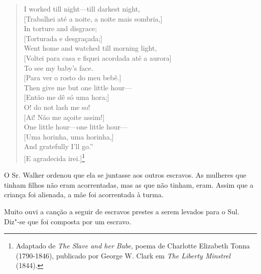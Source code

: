 \begin{verse}
I worked till night---till darkest night,\\
{[}Trabalhei até a noite, a noite mais sombria,{]}\\
In torture and disgrace;\\
{[}Torturada e desgraçada;{]}\\
Went home and watched till morning light,\\
{[}Voltei para casa e fiquei acordada até a aurora{]}\\
To see my baby's face.\\
{[}Para ver o rosto do meu bebê.{]}\\[5pt]

Then give me but one little hour---\\
{[}Então me dê só uma hora;{]}\\
O! do not lash me so!\\
{[}Ai! Não me açoite assim!{]}\\
One little hour---one little hour---\\
{[}Uma horinha, uma horinha,{]}\\
And gratefully I'll go.''\\
{[}E agradecida irei.{]}\footnote{Adaptado de
  \emph{The Slave and her Babe}, poema de Charlotte Elizabeth Tonna
  (1790-1846), publicado por George W. Clark em \emph{The Liberty
  Minstrel} (1844).}
\end{verse}

O Sr. Walker ordenou que ela se juntasse aos outros escravos. As
mulheres que tinham filhos não eram acorrentadas, mas as que não tinham,
eram. Assim que a criança foi alienada, a mãe foi acorrentada à turma.

Muito ouvi a canção a seguir de escravos prestes a serem levados para o
Sul. Diz"-se que foi composta por um escravo.

